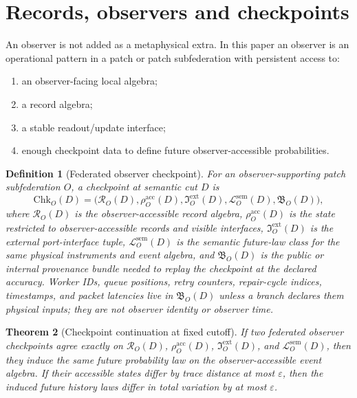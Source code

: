 \documentclass[11pt]{article}
\newtheorem{theorem}{Theorem}[section]
\newtheorem{definition}[theorem]{Definition}
\theoremstyle{remark}
\theoremstyle{plain}
\begin{document}




\section{Records, observers and checkpoints}
\label{sec:records-checkpoints}

An observer is not added as a metaphysical extra. In this paper an observer is an operational
pattern in a patch or patch subfederation with persistent access to:
\begin{enumerate}[leftmargin=2em]
\item an observer-facing local algebra;
\item a record algebra;
\item a stable readout/update interface;
\item enough checkpoint data to define future observer-accessible probabilities.
\end{enumerate}



\begin{definition}[Federated observer checkpoint]
For an observer-supporting patch subfederation \(O\), a checkpoint at semantic cut \(D\) is
\[
\mathrm{Chk}_O(D)=
\bigl(
\mathcal R_O(D),
\rho_O^{\mathrm{acc}}(D),
\mathfrak I_O^{\mathrm{ext}}(D),
\mathcal L_O^{\mathrm{sem}}(D),
\mathfrak B_O(D)
\bigr),
\]
where \(\mathcal R_O(D)\) is the observer-accessible record algebra,
\(\rho_O^{\mathrm{acc}}(D)\) is the state restricted to observer-accessible records and visible
interfaces, \(\mathfrak I_O^{\mathrm{ext}}(D)\) is the external port-interface tuple,
\(\mathcal L_O^{\mathrm{sem}}(D)\) is the semantic future-law class for the same physical
instruments and event algebra, and \(\mathfrak B_O(D)\) is the public or internal provenance bundle
needed to replay the checkpoint at the declared accuracy. Worker IDs, queue positions, retry
counters, repair-cycle indices, timestamps, and packet latencies live in \(\mathfrak B_O(D)\)
unless a branch declares them physical inputs; they are not observer identity or observer time.
\end{definition}

\begin{theorem}[Checkpoint continuation at fixed cutoff]
If two federated observer checkpoints agree exactly on
\(\mathcal R_O(D)\), \(\rho_O^{\mathrm{acc}}(D)\), \(\mathfrak I_O^{\mathrm{ext}}(D)\), and
\(\mathcal L_O^{\mathrm{sem}}(D)\), then they induce the same future probability law on the observer-accessible
event algebra. If their accessible states differ by trace distance at most \(\varepsilon\), then
the induced future history laws differ in total variation by at most \(\varepsilon\).
\end{theorem}
\end{document}

